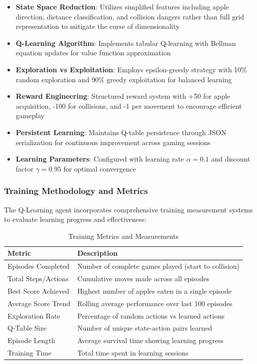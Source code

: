 \documentclass[11pt,a4paper]{article}
\begin{document}
\begin{itemize}
\item \textbf{State Space Reduction}: Utilizes simplified features including apple direction, distance classification, and collision dangers rather than full grid representation to mitigate the curse of dimensionality
\item \textbf{Q-Learning Algorithm}: Implements tabular Q-learning with Bellman equation updates for value function approximation
\item \textbf{Exploration vs Exploitation}: Employs epsilon-greedy strategy with 10\% random exploration and 90\% greedy exploitation for balanced learning
\item \textbf{Reward Engineering}: Structured reward system with +50 for apple acquisition, -100 for collisions, and -1 per movement to encourage efficient gameplay
\item \textbf{Persistent Learning}: Maintains Q-table persistence through JSON serialization for continuous improvement across gaming sessions
\item \textbf{Learning Parameters}: Configured with learning rate $\alpha=0.1$ and discount factor $\gamma=0.95$ for optimal convergence
\end{itemize}

\subsubsection{Training Methodology and Metrics}
The Q-Learning agent incorporates comprehensive training measurement systems to evaluate learning progress and effectiveness:

\begin{table}[H]
\centering
\caption{Training Metrics and Measurements}
\begin{tabular}{@{}ll@{}}
\toprule
\textbf{Metric} & \textbf{Description} \\
\midrule
Episodes Completed & Number of complete games played (start to collision) \\
Total Steps/Actions & Cumulative moves made across all episodes \\
Best Score Achieved & Highest number of apples eaten in a single episode \\
Average Score Trend & Rolling average performance over last 100 episodes \\
Exploration Rate & Percentage of random actions vs learned actions \\
Q-Table Size & Number of unique state-action pairs learned \\
Episode Length & Average survival time showing learning progress \\
Training Time & Total time spent in learning sessions \\
\bottomrule
\end{tabular}
\end{table}
\end{document}

